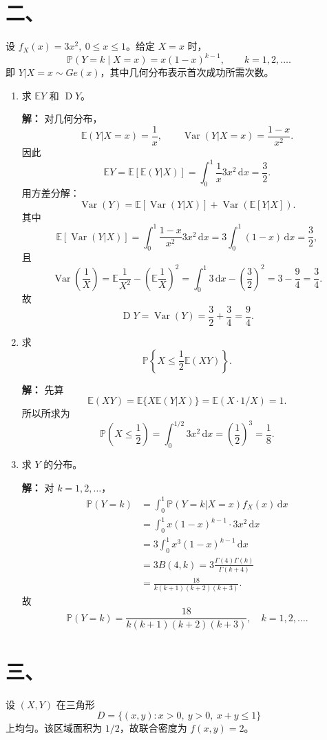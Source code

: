 \documentclass[UTF8,zihao=-4,fontset=windows]{ctexart}
\newcommand{\Prob}{\mathbb P}
\newcommand{\EX}{\mathbb E}
\newcommand{\DD}{\operatorname D}
\newcommand{\Var}{\operatorname{Var}}
\newcommand{\dd}{\,\mathrm d}
\newcommand{\ans}[1]{\textcolor{ansblue}{\textbf{#1}}}
\begin{document}
\section*{二、}
设 $f_X(x)=3x^2,\ 0\le x\le1$。给定 $X=x$ 时，
\[
  \Prob(Y=k\mid X=x)=x(1-x)^{k-1},\qquad k=1,2,\ldots.
\]
即 $Y|X=x\sim Ge(x)$，其中几何分布表示首次成功所需次数。

\begin{enumerate}
  \item 求 $\EX Y$ 和 $\DD Y$。

  \ans{解：} 对几何分布，
  \[
    \EX(Y|X=x)=\frac1x,\qquad
    \Var(Y|X=x)=\frac{1-x}{x^2}.
  \]
  因此
  \[
    \EX Y=\EX\left[\EX(Y|X)\right]
    =\int_0^1 \frac1x 3x^2\dd x
    =\frac32.
  \]
  用方差分解：
  \[
    \Var(Y)=\EX[\Var(Y|X)]+\Var(\EX[Y|X]).
  \]
  其中
  \[
    \EX[\Var(Y|X)]
    =\int_0^1 \frac{1-x}{x^2}3x^2\dd x
    =3\int_0^1(1-x)\dd x=\frac32,
  \]
  且
  \[
    \Var\left(\frac1X\right)=\EX\frac1{X^2}-\left(\EX\frac1X\right)^2
    =\int_0^1 3\dd x-\left(\frac32\right)^2
    =3-\frac94=\frac34.
  \]
  故
  \[
    \DD Y=\Var(Y)=\frac32+\frac34=\frac94.
  \]

  \item 求
  \[
    \Prob\left\{X\le \frac12 \EX(XY)\right\}.
  \]

  \ans{解：} 先算
  \[
    \EX(XY)=\EX\{X\EX(Y|X)\}=\EX(X\cdot 1/X)=1.
  \]
  所以所求为
  \[
    \Prob\left(X\le\frac12\right)=\int_0^{1/2}3x^2\dd x=\left(\frac12\right)^3=\frac18.
  \]

  \item 求 $Y$ 的分布。

  \ans{解：} 对 $k=1,2,\ldots$，
  \[
  \begin{aligned}
    \Prob(Y=k)
    &=\int_0^1 \Prob(Y=k|X=x)f_X(x)\dd x\\
    &=\int_0^1 x(1-x)^{k-1}\cdot 3x^2\dd x\\
    &=3\int_0^1 x^3(1-x)^{k-1}\dd x\\
    &=3B(4,k)=3\frac{\Gamma(4)\Gamma(k)}{\Gamma(k+4)}\\
    &=\frac{18}{k(k+1)(k+2)(k+3)}.
  \end{aligned}
  \]
  故
  \[
    \boxed{\Prob(Y=k)=\frac{18}{k(k+1)(k+2)(k+3)},\quad k=1,2,\ldots.}
  \]
\end{enumerate}

\section*{三、}
设 $(X,Y)$ 在三角形
\[
  D=\{(x,y):x>0,\ y>0,\ x+y\le1\}
\]
上均匀。该区域面积为 $1/2$，故联合密度为 $f(x,y)=2$。
\end{document}

